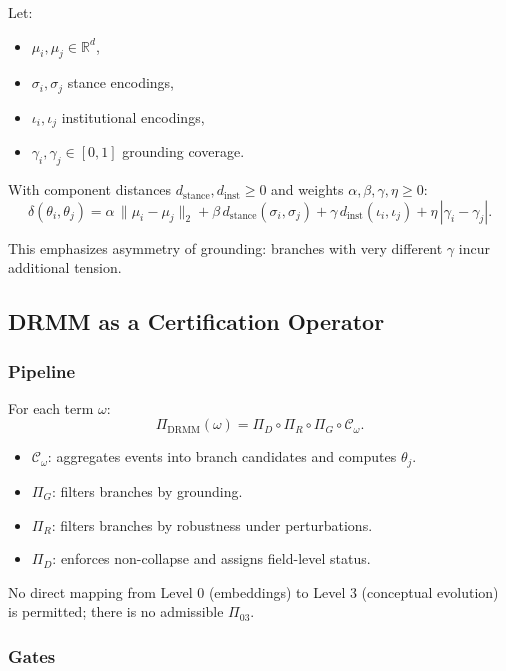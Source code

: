 \documentclass[11pt, a4paper]{article}
\begin{document}
Let:
\begin{itemize}[nosep]
  \item $\mu_i,\mu_j \in \mathbb{R}^d$,
  \item $\sigma_i,\sigma_j$ stance encodings,
  \item $\iota_i,\iota_j$ institutional encodings,
  \item $\gamma_i,\gamma_j \in [0,1]$ grounding coverage.
\end{itemize}
With component distances $d_{\mathrm{stance}}, d_{\mathrm{inst}} \ge 0$ and weights $\alpha,\beta,\gamma,\eta \ge 0$:
\[
\delta(\theta_i,\theta_j)
=
\alpha \,\lVert \mu_i-\mu_j \rVert_2
+
\beta \, d_{\mathrm{stance}}(\sigma_i,\sigma_j)
+
\gamma \, d_{\mathrm{inst}}(\iota_i,\iota_j)
+
\eta \, |\gamma_i-\gamma_j|.
\]

This emphasizes asymmetry of grounding: branches with very different $\gamma$ incur additional tension.

\subsection{DRMM as a Certification Operator}

\subsubsection*{Pipeline}

For each term $\omega$:
\[
\Pi_{\mathrm{DRMM}}(\omega)
=
\Pi_D \circ \Pi_R \circ \Pi_G \circ \mathcal{C}_\omega.
\]

\begin{itemize}[nosep]
  \item $\mathcal{C}_\omega$: aggregates events into branch candidates and computes $\theta_j$.
  \item $\Pi_G$: filters branches by grounding.
  \item $\Pi_R$: filters branches by robustness under perturbations.
  \item $\Pi_D$: enforces non-collapse and assigns field-level status.
\end{itemize}

No direct mapping from Level 0 (embeddings) to Level 3 (conceptual evolution) is permitted; there is no admissible $\Pi_{03}$.

\subsubsection*{Gates}
\end{document}
